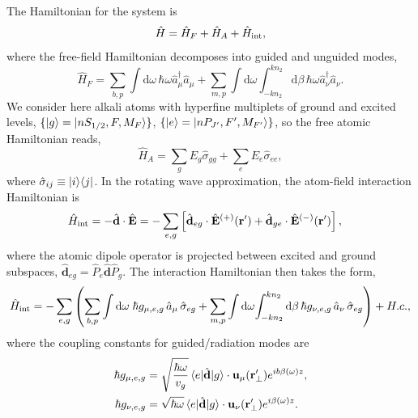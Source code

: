 \documentclass[preprint, aps,pra,onecolumn]{revtex4-1} %
\newcommand{\inter}{{\rm int}}
\begin{document}
The Hamiltonian for the system is
\begin{equation}
\hat{H} = \hat{H}_F+\hat{H}_A + \hat{H}_{\inter},
\end{equation}
where the free-field Hamiltonian decomposes into guided and unguided modes, 
	\begin{equation}
		\hat{H}_F = \sum_{b,p}\int \mathrm{d}\omega \, \hbar \omega \hat{a}^\dagger_\mu \hat{a}_\mu 
+\sum_{m,p} \int \mathrm{d}\omega  \int_{-k n_2}^{k n_2} \mathrm{d}\beta \, \hbar \omega 
\hat{a}^\dagger_\nu \hat{a}_\nu.
	\end{equation}
We consider here alkali atoms with hyperfine multiplets of ground and excited levels, $\{ \lvert{g}\rangle=\lvert{nS_{1/2}, F, M_F}\rangle\}$, $\{ \lvert{e}\rangle =\lvert{nP_{J'}, F', M_{F'}}\rangle\}$, so the free atomic Hamiltonian reads,
	\begin{equation}
		\hat{H}_A  = \sum_g E_g \hat{\sigma}_{gg} + \sum_e E_e \hat{\sigma}_{ee},
	\end{equation}
where $\hat{\sigma}_{ij} \equiv \lvert{i}\rangle\langle{j}\rvert$.  In the rotating wave approximation, the atom-field interaction Hamiltonian is
	\begin{align}
		\hat{H}_{\inter} &= -\hat{\mathbf{d}}\cdot \hat{\mathbf{E}} =- \sum_{e,g} \left[ \hat{\mathbf{d}}_{eg}\cdot 
\hat{\mathbf{E}}^{(+)}(\br')+\hat{\mathbf{d}}_{ge}\cdot \hat{\mathbf{E}}^{(-)}(\br') \right],
	\end{align}
where the atomic dipole operator is projected between excited and ground subspaces, $\hat{\mathbf{d}}_{eg}= \hat{P}_e \hat{\mathbf{d}} \hat{P}_g $. The interaction Hamiltonian then takes the form, 
\begin{equation}
	\hat{H}_{\inter} = -\sum_{e,g} \left(\sum_{b,p} \int\mathrm{d}\omega \; \hbar g_{\mu, e,g}\, \hat{a}_\mu  \, 
		\hat{\sigma}_{eg}+ \sum_{m,p} \int\mathrm{d}\omega \! \int_{-kn_2}^{kn_2}\mathrm{d}\beta \,  \hbar 
g_{\nu, e,g}\, \hat{a}_\nu \, \hat{\sigma}_{eg}\right) + {H.c.},
	\end{equation}
where the coupling constants for guided/radiation modes are
\begin{subequations} \label{Eq::CouplingConstants}
	\begin{align}
		\hbar g_{\mu, e,g} &= \sqrt{\frac{\hbar \omega}{ v_g  }}\, \langle{e}\rvert \hat{\mathbf{d}} \lvert{g}\rangle 
\cdot\mathbf{u}_\mu ( \mathbf{r}'_\perp ) e^{i b \beta(\omega)z} , \\
		\hbar g_{\nu, e,g} &= \sqrt{  \hbar \omega } \, \langle{e}\rvert \hat{\mathbf{d}} \lvert{g}\rangle \cdot \mathbf{u}_\nu ( \mathbf{r}'_\perp) e^{i\beta(\omega)z}  .
	\end{align}
\end{subequations}
\end{document}
